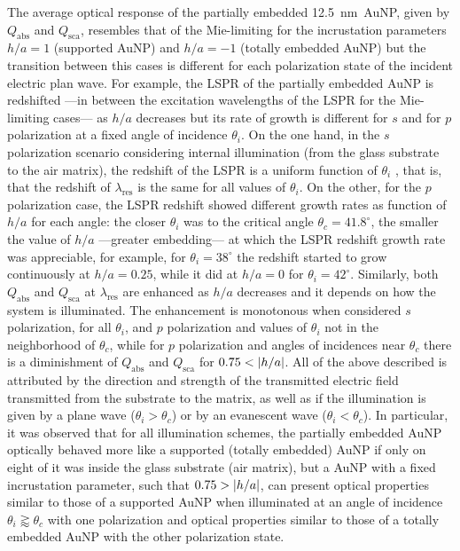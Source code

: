 The average optical response of the partially embedded  12.5~nm~AuNP, given by $Q_\text{abs}$ and  $Q_\text{sca}$, resembles that of the Mie-limiting for the incrustation parameters $h/a = 1$ (supported AuNP) and $h/a= -1$ (totally embedded AuNP) but the transition between this cases is different for each polarization state of the incident electric plan wave. For example, the LSPR of the partially embedded AuNP is redshifted ---in between the excitation wavelengths of the LSPR for the Mie-limiting cases--- as $h/a$ decreases but its rate of growth is different for $s$ and for $p$ polarization  at a fixed angle of incidence $\theta_i$. On the one hand, in the $s$ polarization scenario considering internal illumination (from the glass substrate to the air matrix), the redshift of the LSPR is a uniform  function of $\theta_i$ , that is, that the redshift of $\lambda_\text{res}$ is the same for all values of $\theta_i$. On the other,  for the $p$ polarization case, the LSPR redshift showed different growth rates as function of $h/a$  for each angle: the closer $\theta_i$ was to the critical angle $\theta_c =  41.8 ^\circ$, the smaller the value of $h/a$ ---greater embedding--- at which the LSPR redshift growth rate was appreciable, for example, for $\theta_i = 38^\circ$ the redshift started to grow continuously at $h/a= 0.25$, while it  did at $h/a= 0$ for $\theta_i = 42^\circ$. Similarly, both  $Q_\text{abs}$ and  $Q_\text{sca}$ at $\lambda_\text{res}$ are enhanced as $h/a$ decreases  and it depends on how the system is illuminated. The enhancement is monotonous when considered $s$ polarization, for all $\theta_i$,  and  $p$ polarization and values of $\theta_i$ not in the neighborhood  of  $\theta_c$, while for $p$ polarization and angles of incidences near $\theta_c$ there is a diminishment of $Q_\text{abs}$ and  $Q_\text{sca}$ for $0.75 < \abs{h/a}$. All of the above described is attributed by the direction and strength of the transmitted electric field transmitted from the substrate to the matrix, as well as if the illumination is given by a plane wave ($\theta_i>\theta_c$) or by an evanescent wave ($\theta_i<\theta_c$). In particular, it was  observed that for all illumination schemes, the partially embedded AuNP optically behaved more like a supported (totally embedded)  AuNP if only on eight of it was inside the glass substrate (air matrix), but a AuNP with a fixed incrustation parameter, such that  $0.75 > \abs{h/a}$, can present optical properties similar to those of a supported AuNP when illuminated at an angle of incidence $\theta_i \gtrapprox \theta_c$ with one polarization and optical properties similar to those of a totally embedded AuNP with the other polarization state.

